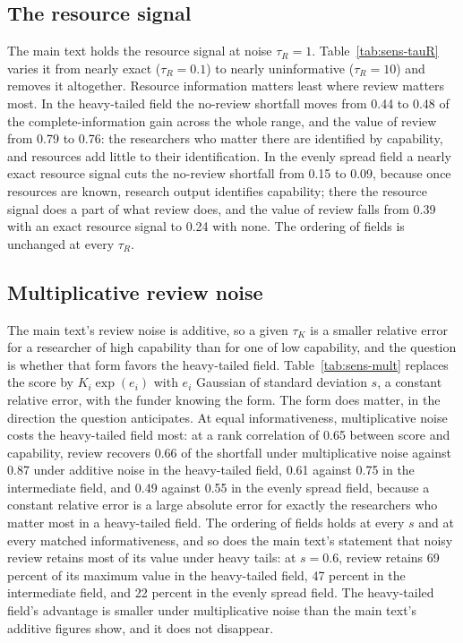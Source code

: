 \subsection*{The resource signal}
The main text holds the resource signal at noise $\tau_R = 1$. Table~\ref{tab:sens-tauR} varies it from nearly exact ($\tau_R = 0.1$) to nearly uninformative ($\tau_R = 10$) and removes it altogether. Resource information matters least where review matters most. In the heavy-tailed field the no-review shortfall moves from 0.44 to 0.48 of the complete-information gain across the whole range, and the value of review from 0.79 to 0.76: the researchers who matter there are identified by capability, and resources add little to their identification. In the evenly spread field a nearly exact resource signal cuts the no-review shortfall from 0.15 to 0.09, because once resources are known, research output identifies capability; there the resource signal does a part of what review does, and the value of review falls from 0.39 with an exact resource signal to 0.24 with none. The ordering of fields is unchanged at every $\tau_R$.



\subsection*{Multiplicative review noise}
The main text's review noise is additive, so a given $\tau_K$ is a smaller relative error for a researcher of high capability than for one of low capability, and the question is whether that form favors the heavy-tailed field. Table~\ref{tab:sens-mult} replaces the score by $K_i\exp(e_i)$ with $e_i$ Gaussian of standard deviation $s$, a constant relative error, with the funder knowing the form. The form does matter, in the direction the question anticipates. At equal informativeness, multiplicative noise costs the heavy-tailed field most: at a rank correlation of 0.65 between score and capability, review recovers 0.66 of the shortfall under multiplicative noise against 0.87 under additive noise in the heavy-tailed field, 0.61 against 0.75 in the intermediate field, and 0.49 against 0.55 in the evenly spread field, because a constant relative error is a large absolute error for exactly the researchers who matter most in a heavy-tailed field. The ordering of fields holds at every $s$ and at every matched informativeness, and so does the main text's statement that noisy review retains most of its value under heavy tails: at $s = 0.6$, review retains 69 percent of its maximum value in the heavy-tailed field, 47 percent in the intermediate field, and 22 percent in the evenly spread field. The heavy-tailed field's advantage is smaller under multiplicative noise than the main text's additive figures show, and it does not disappear.

